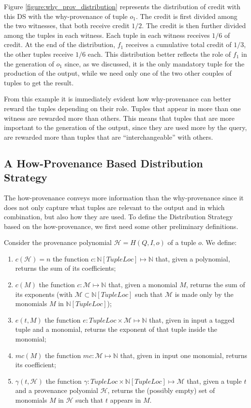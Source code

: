 Figure \ref{figure:why_prov_distribution} represents the distribution of credit with this DS with the why-provenance of tuple $o_1$.
The credit is first divided among the two witnesses, that both receive credit $1/2$. 
The credit is then further divided among the tuples in each witness. Each tuple in each witness receives $1/6$ of credit. At the end of the distribution, $f_1$ receives a cumulative total credit of $1/3$, the other tuples receive $1/6$ each.
This distribution better reflects the role of $f_1$ in the generation of $o_1$ since, as we discussed, it is the only mandatory tuple for the production of the output, while we need only one of the two other couples of tuples to get the result. 

From this example it is immediately evident how why-provenance can better reward the tuples depending on their role. Tuples that appear in more than one witness are rewarded more than others. This means that tuples that are more important to the generation of the output, since they are used more by the query, are rewarded more than tuples that are ``interchangeable'' with others. 

\subsection{A How-Provenance Based Distribution Strategy}
\label{section:how_prov_distr_tuples}
The how-provenance conveys more information than the why-provenance since it does not only capture what tuples are relevant to the output and in which combination, but also how they are used. To define the Distribution Strategy based on the how-provenance, we first need some other preliminary definitions.

Consider the provenance polynomial $\mathcal{H} = H(Q, I, o)$ of a tuple $o$. We define: 
\begin{enumerate}
	\item $c(\mathcal{H}) = n$ the function $c: \mathbb{N}[TupleLoc] \mapsto \mathbb{N}$ that, given a polynomial, returns the sum of its coefficients;
	\item $c(M)$ the function $c: \mathcal{M} \mapsto \mathbb{N}$ that, given a monomial $M$, returns the sum of its exponents (with $\mathcal{M} \subset \mathbb{N}[TupleLoc]$ such that $\mathcal{M}$  is made only by the monomials $M$ in $\mathbb{N}[TupleLoc]$); 
	\item $e(t, M)$ the function $e: TupleLoc \times \mathcal{M} \mapsto \mathbb{N}$ that, given in input a tagged tuple and a monomial, returns the exponent of that tuple inside the monomial;
	\item $mc(M)$ the function $mc: \mathcal{M} \mapsto \mathbb{N}$ that, given in input one monomial, returns its coefficient;
	\item $\gamma(t, \mathcal{H})$ the function $\gamma: TupleLoc \times \mathbb{N}[TupleLoc] \mapsto \mathcal{M}$ that, given a tuple $t$ and a provenance polyomial $\mathcal{H}$, returns the (possibly empty) set of monomials $M$ in $\mathcal{H}$ such that $t$ appears in $M$.
\end{enumerate}

